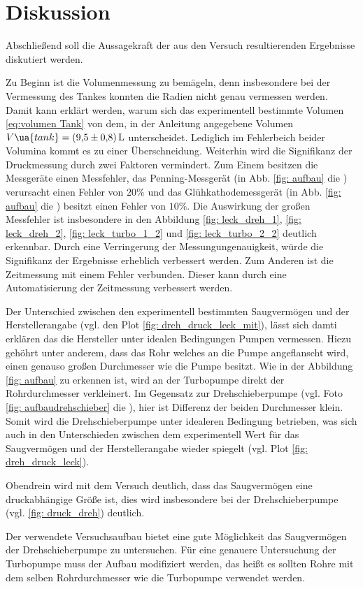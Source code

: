 \section{Diskussion}

Abschließend soll die Aussagekraft der aus den Versuch resultierenden Ergebnisse diskutiert werden.

Zu Beginn ist die Volumenmessung zu bemägeln, denn insbesondere bei der Vermessung des Tankes
konnten die Radien nicht genau vermessen werden. Damit kann erklärt werden, warum sich das experimentell
bestimmte Volumen \eqref{eq:volumen Tank} von dem, in der Anleitung \cite{} angegebene Volumen
$V\ua{tank}=\SI{9.5\pm0,8}{\litre}$ unterscheidet. Lediglich im Fehlerbeich beider Volumina
kommt es zu einer Überschneidung.
Weiterhin wird die Signifikanz der Druckmessung durch zwei Faktoren vermindert.
Zum Einem besitzen die Messgeräte einen Messfehler, das Penning-Messgerät (in Abb. \ref{fig: aufbau} die ) verursacht einen Fehler von $20\%$ und das
Glühkathodemessgerät (in Abb. \ref{fig: aufbau} die ) besitzt einen Fehler von $10\%$. Die Auswirkung der großen Messfehler
ist insbesondere in den Abbildung \ref{fig: leck_dreh_1}, \ref{fig: leck_dreh_2}, \ref{fig: leck_turbo_1_2} und \ref{fig: leck_turbo_2_2} deutlich erkennbar.
Durch eine Verringerung der Messungungenauigkeit, würde die Signifikanz der Ergebnisse erheblich verbessert werden.
Zum Anderen ist die Zeitmessung mit einem Fehler verbunden. Dieser kann durch eine Automatisierung der Zeitmessung verbessert werden.

Der Unterschied zwischen den experimentell bestimmten Saugvermögen und der Herstellerangabe (vgl. den Plot \ref{fig: dreh_druck_leck_mit}),
lässt sich damti erklären das die Hersteller unter idealen Bedingungen Pumpen vermessen. Hiezu gehöhrt unter anderem, dass das Rohr welches an die Pumpe angeflanscht wird,
einen genauso großen Durchmesser wie die Pumpe besitzt. Wie in der Abbildung \ref{fig: aufbau} zu erkennen ist, wird an der Turbopumpe  direkt der
Rohrdurchmesser verkleinert. Im Gegensatz zur Drehschieberpumpe (vgl. Foto \ref{fig: aufbaudrehschieber} die ),
hier ist Differenz der beiden Durchmesser klein. Somit wird die Drehschieberpumpe unter idealeren Bedingung betrieben, was sich auch in den
Unterschieden zwischen dem experimentell Wert für das Saugvermögen und der Herstellerangabe wieder spiegelt (vgl. Plot \ref{fig: dreh_druck_leck}).

Obendrein wird mit dem Versuch deutlich, dass das Saugvermögen eine druckabhängige Größe ist, dies wird insbesondere
bei der Drehschieberpumpe (vgl. \ref{fig: druck_dreh}) deutlich.

Der verwendete Versuchsaufbau bietet eine gute Möglichkeit das Saugvermögen der Drehschieberpumpe zu untersuchen.
Für eine genauere Untersuchung der Turbopumpe muss der Aufbau modifiziert werden, das heißt es sollten Rohre mit
dem selben Rohrdurchmesser wie die Turbopumpe verwendet werden.
